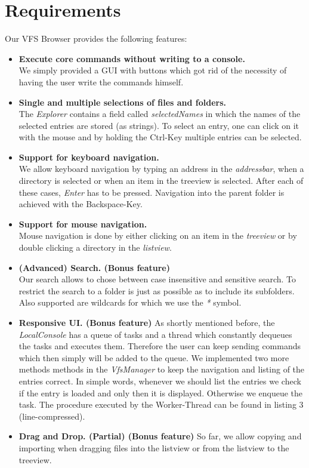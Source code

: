 \documentclass[a4paper,12pt]{article}
\begin{document}
\section{Requirements}
Our VFS Browser provides the following features:
\begin{itemize}
\item \textbf{Execute core commands without writing to a console.} \\
	We simply provided a GUI with buttons which got rid of the necessity of having the user write the commands himself.
\item \textbf{Single and multiple selections of files and folders.} \\
	The \emph{Explorer} contains a field called \emph{selectedNames} in which the names of the selected entries are stored (as strings). To select an 			entry, one can click on it with the mouse and by holding the Ctrl-Key multiple entries can be selected.
\item \textbf{Support for keyboard navigation.} \\
	We allow keyboard navigation by typing an address in the \emph{addressbar}, when a directory is selected or when an item in the treeview is selected. 			After 	each of these cases, \emph{Enter} has to be pressed. Navigation into the parent folder is achieved with the Backspace-Key.
\item \textbf{Support for mouse navigation.} \\
	Mouse navigation is done by either clicking on an item in the \emph{treeview} or by double clicking a directory in the \emph{listview}.
\item \textbf{(Advanced) Search. (Bonus feature) } \\
	Our search allows to chose between case insensitive and sensitive search. To restrict the search to a folder is just as possible as to include its subfolders. 		Also supported are wildcards for which we use the \emph{*} symbol.
\item \textbf {Responsive UI. (Bonus feature)}
	As shortly mentioned before, the \emph{LocalConsole} has a queue of tasks and a thread which constantly dequeues the tasks and executes them. 		Therefore the user can keep sending commands which then simply will be added to the queue. We implemented two more methods methods in 			the \emph{VfsManager} to keep the navigation and listing of the entries correct. In simple words, whenever we should list the entries we check if 			the entry is 	loaded and only then it is displayed. Otherwise we enqueue the task. The procedure executed by the Worker-Thread can be found 			in listing 3 (line-compressed).
\item \textbf{Drag and Drop. (Partial) (Bonus feature)}
	So far, we allow copying and importing when dragging files into the listview or from the listview to the treeview.
\end{itemize}
\end{document}
